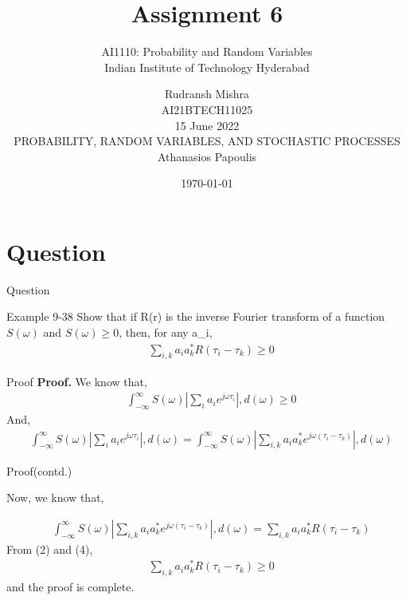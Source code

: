 \documentclass{beamer}
\title{Assignment 6}
\subtitle{\Large AI1110: Probability and Random Variables \\ \large Indian Institute of Technology Hyderabad}
\author{Rudransh Mishra \\ \normalsize AI21BTECH11025 \\ \vspace*{20pt} \normalsize  15 June 2022 \\ \vspace*{20pt} PROBABILITY, RANDOM VARIABLES, AND STOCHASTIC PROCESSES\\ \normalsize Athanasios Papoulis}
\date{\today}
\begin{document}
\begin{frame}
    \titlepage 
\end{frame}

\logo{}


\section{Question}
\begin{frame}{Question}
\begin{block}{Example 9-38}
Show that if R(r) is the inverse Fourier transform of a function $S(\omega)$ and $S(\omega) \geq 0$, then, for any a_i,\\
\begin{align}
&\sum_{i,k}^{} a_i a_k^{*} R(\tau_i - \tau_k) \geq 0
\end{align}
\end{block}
\end{frame}

\begin{frame}{Proof}
\textbf{Proof.}
We know that,
\begin {align}
&\int_{-\infty}^{\infty}S(\omega) |\sum_{i}^{} a_i e^{j \omega \tau_i}|,d(\omega)\geq 0
\end {align}
And,
\begin {align}
&\int_{-\infty}^{\infty}S(\omega) | \sum_{i}^{} a_i e^{j \omega \tau_i}|,d(\omega) = \int_{-\infty}^{\infty}S(\omega) | \sum_{i,k}^{} a_i a_k^{*} e^{j \omega (\tau_i-\tau_k)}| ,d(\omega)
\end {align}
\end{frame}
\begin{frame}{Proof(contd.)}

\begin{center}
Now, we know that,

\begin {align}
&\int_{-\infty}^{\infty}S(\omega) | \sum_{i,k}^{} a_i a_k^{*} e^{j \omega (\tau_i-\tau_k)}| ,d(\omega)=\sum_{i,k}^{} a_i a_k^{*} R(\tau_i - \tau_k)
\end {align}
From (2) and (4),
\begin {align}
&\sum_{i,k}^{} a_i a_k^{*} R(\tau_i - \tau_k) \geq 0
\end {align}
and the proof is complete.
\end{center}

\end{frame}
\end{document}
